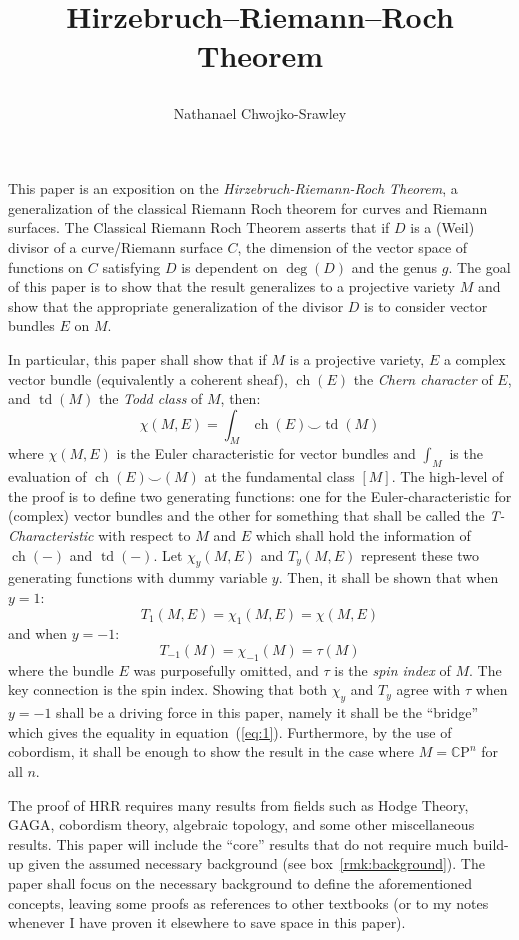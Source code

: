 \documentclass{ut-thesis}
\title{
	\begin{huge}
		\bf{Hirzebruch–Riemann–Roch Theorem}
	\end{huge}
	}
\author{Nathanael Chwojko-Srawley}
\newcommand{\CP}{{\mathbb{C}\mathrm{P}}}
\newcommand{\ch}{{\operatorname{ch}}}
\renewcommand{\deg}{{\operatorname{deg}}}
\newcommand{\td}{{\operatorname{td}}}
\renewcommand{\ch}{{\operatorname{ch}}}
\begin{document}
\maketitle

This paper is an exposition on the \emph{Hirzebruch-Riemann-Roch Theorem}, a generalization of the classical
Riemann Roch theorem for curves and Riemann surfaces. The Classical Riemann Roch Theorem asserts that if $D$
is a (Weil) divisor of a curve/Riemann surface $C$, the dimension of the vector space of functions on $C$
satisfying $D$ is dependent on $\deg(D)$ and the genus $g$. The goal of this paper is to
show that the result generalizes to a projective variety $M$ and show that the appropriate generalization of the
divisor $D$ is to consider vector bundles $E$ on $M$.

In particular, this paper shall show that if $M$ is a projective variety, $E$ a complex vector bundle (equivalently a
coherent sheaf), $\ch(E)$ the \emph{Chern character} of $E$, and $\td(M)$ the \emph{Todd class} of $M$, then:
\begin{equation}\label{eq:1}
  \chi(M, E) = \int_M \ch(E)\smile \td(M)
\end{equation}
where $\chi(M, E)$ is the Euler characteristic for vector bundles and $\int_M$ is the evaluation of
$\ch(E)\smile (M)$ at the fundamental class $[M]$. The high-level of the proof is to define two generating
functions: one for the Euler-characteristic for (complex) vector bundles and the other for
something that shall be called the \emph{T-Characteristic} with respect to $M$ and $E$ which shall hold the
information of $\ch(-)$ and $\td(-)$. Let $\chi_y(M,E)$ and $T_y(M,E)$ represent these two generating
functions with dummy variable $y$. Then, it shall be shown that when $y=1$:
\[
  T_1(M,E) = \chi_1(M,E) = \chi(M,E)
\]
and when $y = -1$:
\[
  T_{-1}(M) = \chi_{-1}(M) = \tau(M)
\]
where the bundle $E$ was purposefully omitted, and $\tau$ is the \emph{spin index} of $M$. The key connection
is the spin index. Showing that both $\chi_y$ and $T_y$ agree with $\tau$ when $y=-1$ shall be a driving
force in this paper, namely it shall be the ``bridge'' which gives the equality in equation~(\ref{eq:1}). Furthermore, by
the use of cobordism, it shall be enough to show the result in the case where $M = \CP^n$ for all $n$.



The proof of HRR requires many results from fields such as Hodge Theory, GAGA, cobordism theory, algebraic
topology, and some other miscellaneous results. This paper will include the ``core'' results that do not require much
build-up given the assumed necessary background (see box~\ref{rmk:background}). The paper shall focus on the
necessary background to define the aforementioned concepts, leaving some proofs as references to other
textbooks (or to my notes whenever I have proven it elsewhere to save space in this paper).
\end{document}
